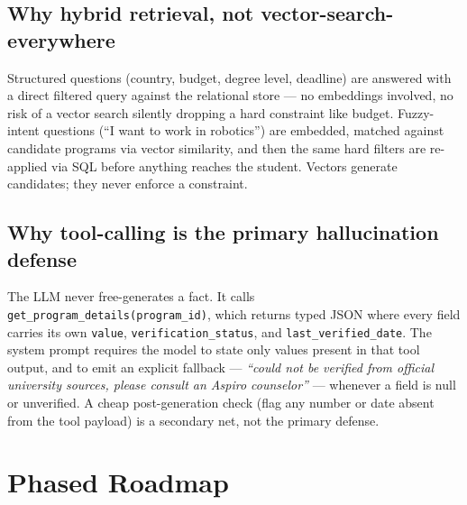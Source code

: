 \documentclass[11pt,a4paper]{article}
\begin{document}
\subsection{Why hybrid retrieval, not vector-search-everywhere}
Structured questions (country, budget, degree level, deadline) are answered with a direct filtered query against the relational store --- no embeddings involved, no risk of a vector search silently dropping a hard constraint like budget. Fuzzy-intent questions (``I want to work in robotics'') are embedded, matched against candidate programs via vector similarity, and then the same hard filters are re-applied via SQL before anything reaches the student. Vectors generate candidates; they never enforce a constraint.

\subsection{Why tool-calling is the primary hallucination defense}
\label{sec:grounding}
The LLM never free-generates a fact. It calls \texttt{get\_program\_details(program\_id)}, which returns typed JSON where every field carries its own \texttt{value}, \texttt{verification\_status}, and \texttt{last\_verified\_date}. The system prompt requires the model to state only values present in that tool output, and to emit an explicit fallback --- \emph{``could not be verified from official university sources, please consult an Aspiro counselor''} --- whenever a field is null or unverified. A cheap post-generation check (flag any number or date absent from the tool payload) is a secondary net, not the primary defense.

\section{Phased Roadmap}
\end{document}
